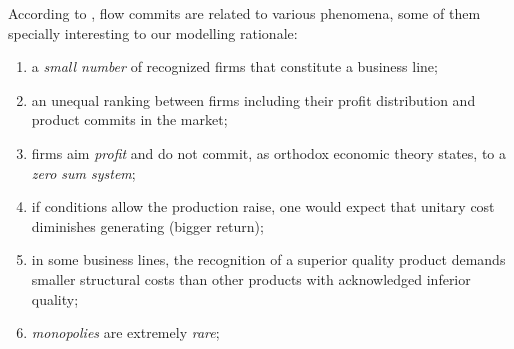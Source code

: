 \documentclass[a4paper, 12pt, openright, oneside, german, french, brazil, english]{abntex2}
\begin{document}
	According to , flow commits are related to various phenomena, some of them specially interesting to our modelling rationale:
	
	\begin{enumerate}
		\item a \textit{small number} of recognized firms that constitute a business line;
		\item an unequal ranking between firms including their profit distribution and product commits in the market;
		\item firms aim \textit{profit} and do not commit, as orthodox economic theory states, to a \textit{zero sum system};
		\item if conditions allow the production raise, one would expect that unitary cost diminishes generating (bigger return);
		\item in some business lines, the recognition of a superior quality product demands smaller structural costs than other products with acknowledged inferior quality;
		\item \textit{monopolies} are extremely \textit{rare};
	\end{enumerate}
	
	
	
\end{document}
